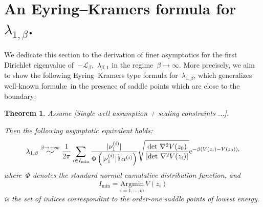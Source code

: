 \documentclass[10pt]{article}
\newcommand{\cL}{\mathcal{L}}
\newcommand{\e}{\mathrm{e}}
\newcommand{\1}{\mathbbm 1}
\newcommand{\epsLimit}[1]{\alpha^{(#1)}} %
\newcommand{\hessEigval}[2]{\nu^{(#1)}_{#2}} %
\newcommand{\widesim}[2][1.5]{
  \mathrel{\overset{#2}{\scalebox{#1}[1]{$\sim$}}}
}
\newtheorem{lemma}{Lemma}
\newtheorem{theorem}{Theorem}
\begin{document}

    \section{An Eyring--Kramers formula for~$\lambda_{1,\beta}$.}
    \label{sec:ek}
    We dedicate this section to the derivation of finer asymptotics for the first Dirichlet eigenvalue of~$-\cL_\beta$,~$\lambda_{\beta,1}$ in the regime~$\beta\to\infty$. More precisely, we aim to show the following Eyring--Kramers type formula for~$\lambda_{1,\beta}$, which generalizes well-known formul\ae~in the presence of saddle points which are close to the boundary:
    \begin{theorem}
        \label{thm:eyring_kramers}
        Assume [Single well assumption + scaling constraints ...].

        Then the following asymptotic equivalent holds:
        \begin{equation}
            \label{eq:eyring_kramers}
            \lambda_{1,\beta} \widesim{\beta\to+\infty} \frac1{2\pi}\sum_{i\in I_{\min}} \frac{|\hessEigval{i}{1}|}{\Phi\left(|\hessEigval{i}{1}|^{\frac12}\epsLimit{i}\right)}\sqrt{\frac{\det\,\nabla^2 V(z_0)}{\left|\det\,\nabla^2 V(z_i)\right|}}\e^{-\beta\left(V(z_i)-V(z_0)\right),}
        \end{equation}
        where~$\Phi$ denotes the standard normal cumulative distribution function, and
        \begin{equation}
            I_{\min} = \underset{i=1,\dots,m}{\mathrm{Argmin}}\,V(z_i)
        \end{equation}
        is the set of indices correspondint to the order-one saddle points of lowest energy.
    \end{theorem}
\end{document}
